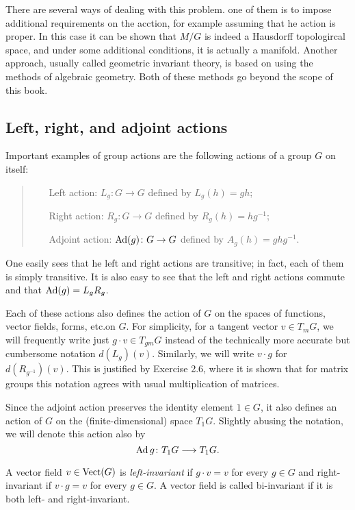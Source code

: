 There are several ways of dealing with this problem. one of them is to
impose additional requirements on the acction, for example assuming that he
action is proper. In this case it can be shown that $M/G$ is indeed a
Hausdorff topologircal space, and under some additional conditions, it is
actually a manifold. Another approach, usually called geometric invariant
theory, is based on using the methods of algebraic geometry. Both of these
methods go beyond the scope of this book.

\subsection{Left, right, and adjoint actions}
Important examples of group actions are the following actions of a group
$G$ on itself:
\begin{quote}
\begin{itemize}
\item[Left action:] $L_g\colon G\to G$ defined by $L_g(h)=gh$;
\item[Right action:] $R_g\colon G\to G$ defined by $R_g(h)=hg^{-1}$;
\item[Adjoint action:] $\operatorname{Ad}(g)\colon G\to G$ defined by $A_g(h)=ghg^{-1}$.
\end{itemize}
\end{quote}

One easily sees that he left and right actions are transitive; in fact,
each of them is simply transitive. It is also easy to see that the left and
right actions commute and that $\operatorname{Ad}(g)=L_gR_g$.

Each of these actions also defines the action of $G$ on the spaces of
functions, vector fields, forms, etc.\@ on $G$. For simplicity, for a
tangent vector $v\in T_mG$, we will frequently write just
$g\cdot v\in T_{gm}G$ instead of the technically more accurate but
cumbersome notation $d(L_g)(v)$. Similarly, we will write $v\cdot g$ for
$d(R_{g^{-1}})(v)$. This is justified by Exercise 2.6, where it is shown
that for matrix groups this notation agrees with usual multiplication of
matrices.

Since the adjoint action preserves the identity element $1\in G$,  it also
defines an action of $G$ on the (finite-dimensional) space $T_1G$. Slightly
abusing the notation, we will denote this action also by
\[
  \operatorname{Ad} g\colon T_1G\longrightarrow T_1G.
\]

\begin{definition}
  A vector field $v\in\operatorname{Vect}(G)$ is \emph{left-invariant} if
  $g\cdot v=v$ for every $g\in G$ and right-invariant if $v\cdot
  g=v$ for every $g\in G$. A vector field is called bi-invariant if it
  is both left- and right-invariant.
\end{definition}

